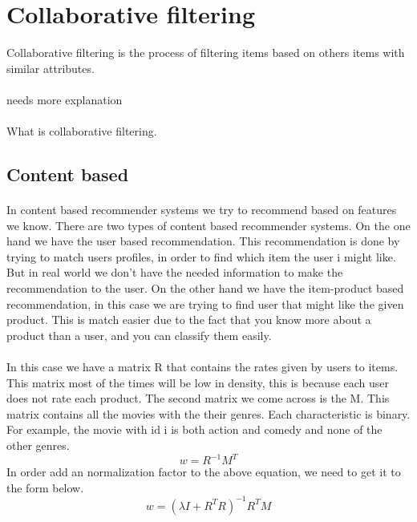 \section{Collaborative filtering}
Collaborative filtering is the process of filtering items based on others items with similar attributes.
\\\\needs more explanation\\\\
What is collaborative filtering.
\cite{RecommenderSystems:2}
\subsection{Content based}

\paragraph{}In content based recommender systems we try to recommend based on features we know. There are two types of content based recommender systems. On the one hand we have the user based recommendation. This recommendation is done by trying to match users profiles, in order to find which item the user i might like. But in real world we don't have the needed information to make the recommendation to the user. On the other hand we have the item-product based recommendation, in this case we are trying to find user that might like the given product. This is match easier due to the fact that you know more about a product than a user, and you can classify them easily.
\paragraph{}In this case we have a matrix R that contains the rates given by users to items. This matrix most of the times will be low in density, this is because each user does not rate each product. The second matrix we come across is the M. This matrix contains all the movies with the their genres. Each characteristic is binary. For example, the movie with id i is both action and comedy and none of the other genres.
\begin{equation}
 w=R^{-1}M^{T}
\end{equation}
In order add an normalization factor to the above equation, we need to get it to the form below.
\begin{equation}
 w=(\lambda I + R^{T}R)^{-1} R^{T}M 
\end{equation}

